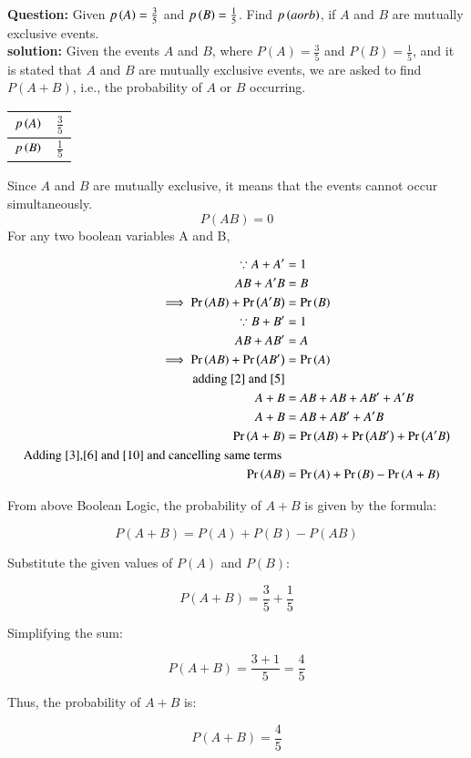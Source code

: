 \documentclass[journal]{IEEEtran}
\begin{document}
\textbf{Question:}
Given $p\left(A\right)=\frac{3}{5}$ and $p\left(B\right)=\frac{1}{5}$. Find $p\left(a or b\right)$, if $A$ and $B$ are mutually exclusive events.\\
\textbf{solution:}
Given the events \( A \) and \( B \), where \( P(A) = \frac{3}{5} \) and \( P(B) = \frac{1}{5} \), and it is stated that \( A \) and \( B \) are mutually exclusive events, we are asked to find \( P(A + B) \), i.e., the probability of \( A \) or \( B \) occurring.\\
\begin{center}
\begin{tabular}{|c|c|}
    \hline
    $p\left(A\right)$ & $\frac{3}{5}$ \\
    \hline
    $p\left(B\right)$ & $\frac{1}{5}$\\
    \hline
\end{tabular}
\end{center}
Since \( A \) and \( B \) are mutually exclusive, it means that the events cannot occur simultaneously.\\
\[
P(AB)=0
\]
 For any two boolean variables A and B,
\begin{center}
\begin{align}
	\because A + A^\prime &= 1 \\
	 AB + A^\prime B &= B \label{2} \\
	 \implies \Pr\left(AB\right) + \Pr\left(A^\prime B\right) &= \Pr\left(B\right) \label{3} \\
	 \because B + B^\prime &= 1 \\
	 AB + AB^\prime &= A \label{5}\\
	 \implies \Pr\left(AB\right) + \Pr\left(AB^\prime\right) &= \Pr\left(A\right) \label{6} \\
	 \text{adding } \eqref{2} \text{ and } \eqref{5} \\
	 A + B &= AB + AB + AB^\prime + A^\prime B  \\
	 A + B &= AB + AB^\prime + A^\prime B \\ 
	 \Pr\left(A + B\right) &= \Pr\left(AB\right) + \Pr\left(AB^\prime\right) + \Pr\left(A^\prime B\right) \label{10}\\
	 \text{Adding \eqref{3},\eqref{6} and \eqref{10} and cancelling same terms } \\
	 \Pr\left(AB\right) &= \Pr\left(A\right) + \Pr\left(B\right) - \Pr\left(A + B\right)
\end{align}
\end{center}
From above Boolean Logic, the probability of \( A + B \) is given by the formula:

\[
P(A+B) = P(A) + P(B) - P(AB)
\]

Substitute the given values of \( P(A) \) and \( P(B) \):

\[
P(A + B) = \frac{3}{5} + \frac{1}{5}
\]

Simplifying the sum:

\[
P(A + B) = \frac{3 + 1}{5} = \frac{4}{5}
\]

Thus, the probability of \( A + B \) is:

\[
P(A + B) = \frac{4}{5}
\]
\end{document}
